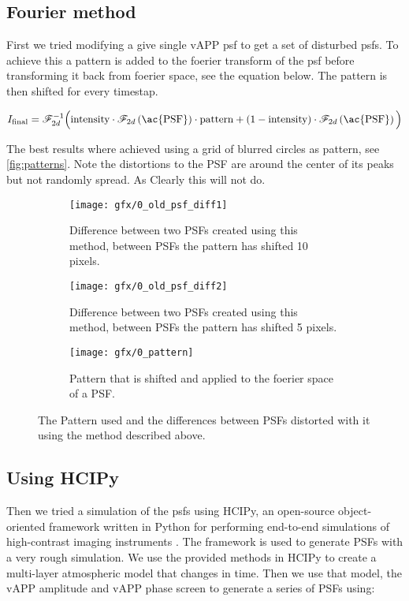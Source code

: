 \subsection{Fourier method}
First we tried modifying a give single \ac{vAPP} psf to get a set of disturbed psfs. To achieve this a pattern is added to the foerier transform of the psf before transforming it back from foerier space, see the equation below. The pattern is then shifted for every timestap.

\begin{equation}
I_{\text{final}} = \mathscr{F}_{2d}^{-1} \Big( \text{intensity} \cdot \mathscr{F}_{2d}\left(\text{\ac{PSF}}\right) \cdot \text{pattern} + \left(1-\text{intensity}\right) \cdot \mathscr{F}_{2d}\left(\text{\ac{PSF}}\right) \Big)
\end{equation}

The best results where achieved using a grid of blurred circles as pattern, see \autoref{fig:patterns}. Note the distortions to the \ac{PSF} are around the center of its peaks but not randomly spread. As Clearly this will not do.

\begin{figure}[h!]
      \begin{subfigure}[t]{0.5\textwidth}
        \texttt{[image: gfx/0\_old\_psf\_diff1]}
        \caption{Difference between two \acp{PSF}  created using this method, between \acp{PSF} the pattern has shifted 10 pixels.}
      \end{subfigure}%
      \begin{subfigure}[t]{0.5\textwidth}
        \texttt{[image: gfx/0\_old\_psf\_diff2]}
        \caption{Difference between two \acp{PSF}  created using this method, between \acp{PSF} the pattern has shifted 5 pixels.}
      \end{subfigure}
      
      \begin{subfigure}[]{0.5\textwidth}
        \texttt{[image: gfx/0\_pattern]}
        \caption{Pattern that is shifted and applied to the foerier space of a \ac{PSF}.}
      \end{subfigure}
      
  \caption{The Pattern used and the differences between \acp{PSF} distorted with it using the method described above.}
  \label{fig:patterns}
\end{figure}

\subsection{Using HCIPy}
\label{sec:hcipy}
Then we tried a simulation of the psfs using \ac{HCIPy}, an open-source object-oriented framework written in Python for performing end-to-end simulations of high-contrast imaging instruments \cite{hcipy}. The framework is used to generate \acp{PSF} with a very rough simulation. We use the provided methods in \ac{HCIPy} to create a multi-layer atmospheric model that changes in time. Then we use that model, the \ac{vAPP} amplitude and \ac{vAPP} phase screen to generate a series of \acp{PSF} using:

